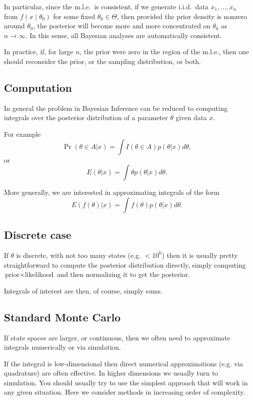 \documentclass[12pt]{article}
\begin{document}
In particular, since the m.l.e.\ is consistent, if we generate
i.i.d.\ data $x_1,\ldots,x_n$ from $f(x\mid \theta_0)$ for some fixed
$\theta_0 \in \Theta$, then provided the prior density is nonzero
around $\theta_0$, the posterior will become more and more
concentrated on $\theta_0$ as $n \rightarrow \infty$.  In this sense,
all Bayesian analyses are automatically consistent.

In practice, if, for large $n$, the prior were zero in the region of the
m.l.e., then one should reconsider the prior, or the sampling
distribution, or both.


\subsection{Computation}


In general the problem in Bayesian Inference can
be reduced to computing integrals over the posterior distribution
of a parameter $\theta$ given data $x$.

For example
$$\Pr(\theta \in A | x) = \int I(\theta \in A) p(\theta | x) d\theta,$$
or
$$E(\theta | x) = \int \theta p(\theta | x) d\theta.$$

More generally, we are interested in approximating integrals of the form
$$E(f(\theta) |x) = \int f(\theta) p(\theta | x) d\theta.$$


\subsection{Discrete case}

If $\theta$ is discrete, with not too many states (e.g. $< 10^6$) then it is usually pretty straightforward to compute the posterior distribution directly, simply computing $\text{prior} \times \text{likelihood}$ and then normalizing it to get the posterior. 

Integrals of interest are then, of course, simply sums.


\subsection{Standard Monte Carlo}

If state spaces are larger, or continuous, then we often need
to approximate integrals numerically or via simulation.

If the integral is low-dimensional then direct numerical approximations (e.g. via quadrature)
are often effective. In higher dimensions we usually turn to simulation. You should usually try to use the simplest approach that will work in any given situation. Here we consider methods in increasing order of complexity.
\end{document}

